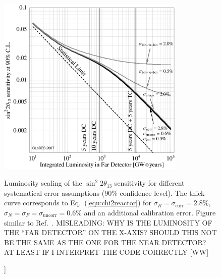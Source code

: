 \documentclass[12pt,a4paper]{article}
\newcommand{\capdef}{}
\newcommand{\mycaption}[2][\capdef]{\renewcommand{\capdef}{#2}%
       \caption[#1]{{\footnotesize #2}}}
\newcommand{\eq}{Eq.}
\newcommand{\Ref}{Ref.}
\newcommand{\stheta}{\sin^2 2 \theta_{13}}
\newcommand{\equ}[1]{\eq~(\ref{equ:#1})}
\begin{document}
\begin{figure}[t]
\begin{center}
\includegraphics[width=9cm]{reactor}
\end{center}
\mycaption{\label{fig:reactor} Luminosity scaling of the $\stheta$ sensitivity for different systematical error assumptions (90\% confidence level). The thick curve corresponds to \equ{chi2reactor} for $\sigma_R=\sigma_{\mathrm{corr}}=2.8\%$, $\sigma_N=\sigma_F=\sigma_{\mathrm{uncorr}}=0.6\%$ and an additional calibration error. Figure similar to \Ref~\cite{Huber:2006vr}. MISLEADING: WHY IS THE LUMINOSITY
OF THE ``FAR DETECTOR'' ON THE X-AXIS? SHOULD THIS NOT BE THE SAME AS THE ONE FOR THE NEAR DETECTOR? 
AT LEAST IF I INTERPRET THE CODE CORRECTLY [WW]}
\end{figure}
\end{document}
